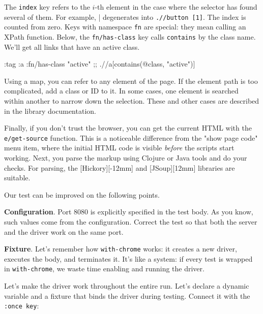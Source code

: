 
The \verb|index| key refers to the $i$-th element in the case where the selector has found several of them. For example, | degenerates into \verb|.//button [1]|. The index is counted from zero. Keys with namespace \verb|fn| are special: they mean calling an XPath function. Below, the \verb|fn/has-class| key calls \verb|contains| by the class name. We'll get all links that have an active class.

\begin{english}
  \begin{clojure}
{:tag :a :fn/has-class "active"}
;; .//a[contains(@class, "active")]
  \end{clojure}
\end{english}

Using a map, you can refer to any element of the page. If the element path is too complicated, add a class or ID to it. In some cases, one element is searched within another to narrow down the selection. These and other cases are described in the library documentation.

Finally, if you don't trust the browser, you can get the current HTML with the \verb|e/get-source| function. This is a noticeable difference from the "show page code" menu item, where the initial HTML code is visible \emph{before} the scripts start working. Next, you parse the markup using Clojure or Java tools and do your checks. For parsing, the [Hickory][-12mm] and [JSoup][12mm] libraries are suitable.


Our test can be improved on the following points.

\textbf{Configuration}. Port 8080 is explicitly specified in the test body. As you know, such values come from the configuration. Correct the test so that both the server and the driver work on the same port.


\textbf{Fixture}. Let's remember how \texttt{with-chrome} works: it creates a new driver, executes the body, and terminates it. It's like a system: if every test is wrapped in \verb|with-chrome|, we waste time enabling and running the driver.

Let's make the driver work throughout the entire run. Let's declare a dynamic variable and a fixture that binds the driver during testing. Connect it with the \verb|:once key|:


